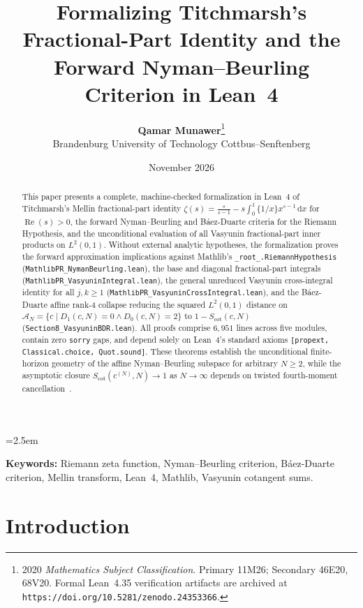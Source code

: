 \documentclass[11pt,a4paper]{article}
\title{\textbf{Formalizing Titchmarsh's Fractional-Part Identity and the Forward Nyman--Beurling Criterion in Lean~4}}
\author{\textbf{Qamar Munawer}\thanks{2020 \emph{Mathematics Subject Classification}. Primary 11M26; Secondary 46E20, 68V20. Formal Lean~4.35 verification artifacts are archived at \texttt{https://doi.org/10.5281/zenodo.24353366}.}\\[0.3em]
\small Brandenburg University of Technology Cottbus--Senftenberg}
\date{November 2026}
\theoremstyle{definition}
\newcommand{\dee}{\mathrm{d}}
\begin{document}
\linespread{1.15}\selectfont
\emergencystretch=2.5em

\maketitle

\begin{abstract}
This paper presents a complete, machine-checked formalization in Lean~4 of Titchmarsh's Mellin fractional-part identity $\zeta(s) = \frac{s}{s-1} - s\int_0^1 \{1/x\} x^{s-1}\,\dee x$ for $\operatorname{Re}(s) > 0$, the forward Nyman--Beurling and B\'aez-Duarte criteria for the Riemann Hypothesis, and the unconditional evaluation of all Vasyunin fractional-part inner products on $L^2(0, 1)$. Without external analytic hypotheses, the formalization proves the forward approximation implications against Mathlib's \texttt{\_root\_.\allowbreak RiemannHypothesis} (\texttt{MathlibPR\_\allowbreak NymanBeurling.lean}), the base and diagonal fractional-part integrals (\texttt{MathlibPR\_\allowbreak VasyuninIntegral.lean}), the general unreduced Vasyunin cross-integral identity for all $j, k \ge 1$ (\texttt{MathlibPR\_\allowbreak VasyuninCrossIntegral.lean}), and the B\'aez-Duarte affine rank-4 collapse reducing the squared $L^2(0, 1)$ distance on $\mathcal{A}_N = \{c \mid D_1(c, N) = 0 \land D_0(c, N) = 2\}$ to $1 - S_{\mathrm{cot}}(c, N)$ (\texttt{Section8\_\allowbreak VasyuninBDR.lean}). All proofs comprise $6{,}951$ lines across five modules, contain zero \texttt{sorry} gaps, and depend solely on Lean~4's standard axioms \texttt{[propext, Classical.choice, Quot.sound]}. These theorems establish the unconditional finite-horizon geometry of the affine Nyman--Beurling subspace for arbitrary $N \ge 2$, while the asymptotic closure $S_{\mathrm{cot}}(c^{(N)}, N) \to 1$ as $N \to \infty$ depends on twisted fourth-moment cancellation~\cite{BettinBrowning2014}.
\end{abstract}

\vspace{0.5em}
\noindent\textbf{Keywords:} Riemann zeta function, Nyman--Beurling criterion, B\'aez-Duarte criterion, Mellin transform, Lean~4, Mathlib, Vasyunin cotangent sums.

\section{Introduction}
\end{document}
